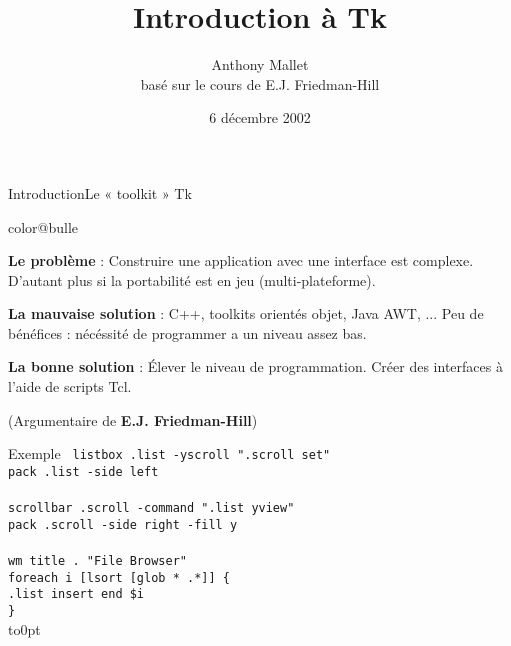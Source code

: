 \documentclass[a4paper,landscape,smooth]{show}
\title{Introduction à \Huge Tk}
\author{Anthony Mallet\\ basé sur le cours de E.J. Friedman-Hill}
\date{6 décembre 2002}
\begin{document}
\maketitle


\begin{part}{Introduction}{Le « toolkit » Tk}
   \vfill
   \begin{bitemize}{color@bulle}
      \item {\bf Le problème} : Construire une application avec une
	 interface est complexe. D'autant plus si la portabilité est en
	 jeu (multi-plateforme).

      \item {\bf La mauvaise solution} : 
	 C++, toolkits orientés objet, Java AWT, ...
	 Peu de bénéfices : nécéssité de programmer a un niveau assez
	 bas.

      \item {\bf La bonne solution} : 
	 Élever le niveau de programmation. Créer des interfaces à l'aide
	 de scripts Tcl.
   \end{bitemize}
   \vfill
   (Argumentaire de {\bf E.J. Friedman-Hill})
   \vfill
\end{part}


\begin{tslide}{Exemple}
   \vfill
   {\tt
   listbox .list -yscroll ".scroll set"\\
   pack .list -side left\\
\\
   scrollbar .scroll -command ".list yview"\\
   pack .scroll -side right -fill y\\
\\
   wm title . "File Browser"\\
   foreach i [lsort [glob * .*]] \{\\
\hspace*{1cm}.list insert end \$i\\ \}\\
   }
   \vfill
   \vbox to0pt{\vss\hfill{}}
\end{tslide}

\end{document}
